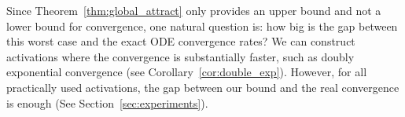\documentclass[twoside]{article}
\newcommand{\E}{\mathbb{E}\,}
\newcommand{\he}{\mathrm{he}}
\theoremstyle{definition}
\newcommand{\thomas}[1]{{\color{blue}\textit{#1}}}
\begin{document}
Since Theorem~\ref{thm:global_attract} only provides an upper bound and not a lower bound for convergence, one natural question is: how big is the gap between this worst case and the exact ODE convergence rates? We can construct activations where the convergence is substantially faster, such as doubly exponential convergence (see Corollary~\ref{cor:double_exp}). However, for all practically used activations, the gap between our bound and the real convergence is enough (See Section~\ref{sec:experiments}).




% 



 
\end{document}
